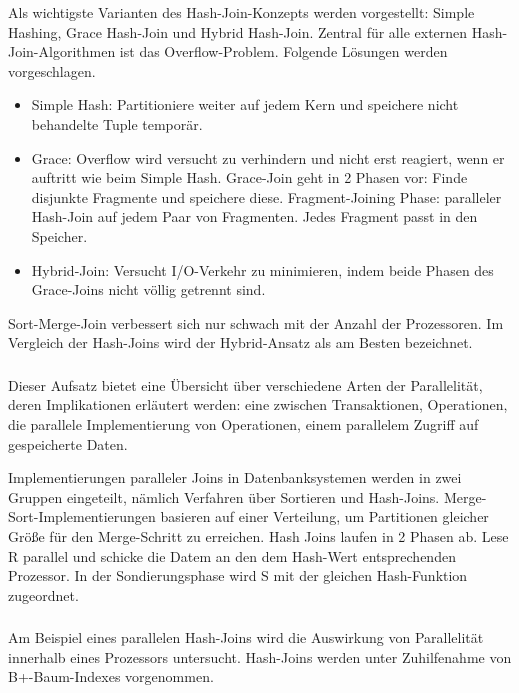 \documentclass[a4paper,12pt,twoside]{article}
\begin{document}
Als wichtigste Varianten des Hash-Join-Konzepts werden vorgestellt: Simple Hashing, Grace Hash-Join und Hybrid Hash-Join. Zentral für alle externen Hash-Join-Algorithmen ist das Overflow-Problem. Folgende Lösungen werden vorgeschlagen.

\begin{itemize}
	\item Simple Hash: Partitioniere weiter auf jedem Kern und speichere nicht behandelte Tuple temporär.
	\item Grace: Overflow wird versucht zu verhindern und nicht erst reagiert, wenn er auftritt wie beim Simple Hash. Grace-Join geht in 2 Phasen vor: Finde disjunkte Fragmente und speichere diese. Fragment-Joining Phase: paralleler Hash-Join auf jedem Paar von Fragmenten. Jedes Fragment passt in den Speicher.
	\item Hybrid-Join: Versucht I/O-Verkehr zu minimieren, indem beide Phasen des Grace-Joins nicht völlig getrennt sind.
\end{itemize}

Sort-Merge-Join verbessert sich nur schwach mit der Anzahl der Prozessoren. Im Vergleich der Hash-Joins wird der Hybrid-Ansatz als am Besten bezeichnet.

\subsubsection*{}

Dieser Aufsatz bietet eine Übersicht über verschiedene Arten der Parallelität, deren Implikationen erläutert werden: eine zwischen Transaktionen, Operationen, die parallele Implementierung von Operationen, einem parallelem Zugriff auf gespeicherte Daten.

Implementierungen paralleler Joins in Datenbanksystemen werden in zwei Gruppen eingeteilt, nämlich Verfahren über Sortieren und Hash-Joins. Merge-Sort-Implementierungen basieren auf einer Verteilung, um Partitionen gleicher Größe für den Merge-Schritt zu erreichen. Hash Joins laufen in 2 Phasen ab. Lese R parallel und schicke die Datem an den dem Hash-Wert entsprechenden Prozessor. In der Sondierungsphase wird S mit der gleichen Hash-Funktion zugeordnet.

\subsubsection*{}

Am Beispiel eines parallelen Hash-Joins wird die Auswirkung von Parallelität innerhalb eines Prozessors untersucht. Hash-Joins werden unter Zuhilfenahme von B+-Baum-Indexes vorgenommen. 
\end{document}
